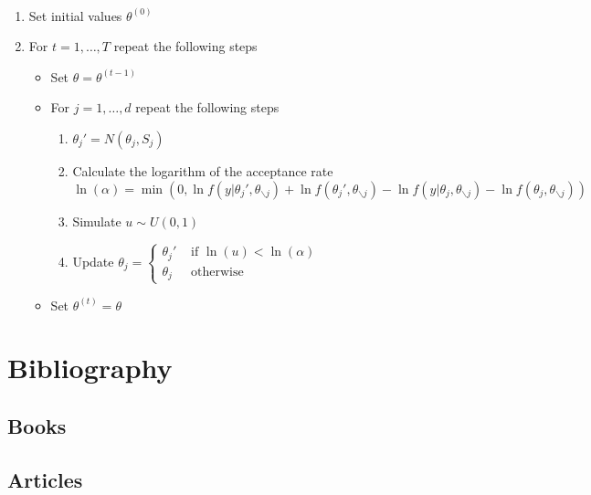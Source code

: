 \documentclass[11pt,fleqn]{book} %
\begin{document}
\begin{algorithm} \ 
\begin{enumerate}
\item Set initial values $\theta^{(0)}$
\item For $t=1,\dots,T$ repeat the following steps
\begin{itemize}
\item Set $\theta=\theta^{(t-1)}$
\item For $j=1,\dots,d$ repeat the following steps
\begin{enumerate}[label=\alph*.]
\item $\theta_j' = N(\theta_j,S_j)$
\item Calculate the logarithm of the acceptance rate \\
      $\ln(\alpha) = \min \left( 0,
          \ln f(y|\theta_j',\theta_{\backslash j}) + 
          \ln f(\theta_j',\theta_{\backslash j}) - 
          \ln f(y|\theta_j,\theta_{\backslash j}) - 
          \ln f(\theta_j,\theta_{\backslash j})
       \right)$
\item Simulate $u \sim U(0,1)$
\item Update $\theta_j=\left\{
  \begin{array}{ll}
  \theta_j' & \text{ if } \ln(u) < \ln(\alpha) \\
  \theta_j  & \text{ otherwise }
  \end{array}\right.$ 
\end{enumerate}
\item Set $\theta^{(t)}=\theta$
\end{itemize}
\end{enumerate}
\end{algorithm}



\chapter*{Bibliography}
\section*{Books}
\printbibliography[heading=bibempty,type=book]
\section*{Articles}
\printbibliography[heading=bibempty,type=article]
\end{document}
